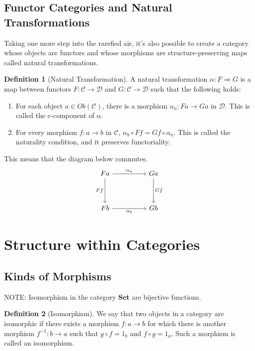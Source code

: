 \documentclass{article}
\theoremstyle{definition}
\newtheorem{definition}{Definition}
\begin{document}
\subsection*{Functor Categories and Natural Transformations}
Taking one more step into the rarefied air, it's also possible to create a category whose objects are functors and whose morphisms are structure-preserving maps called natural transformations.
\begin{definition}[Natural Transformation]
    A natural transformation $\alpha :F\Rightarrow G$ is a map between functors $F:\mathcal{C}\rightarrow\mathcal{D}$ and $G:\mathcal{C}\rightarrow\mathcal{D}$ such that the following holds:
    \begin{enumerate}
        \item For each object $a \in Ob(\mathcal{C})$, there is a morphism $\alpha_a:Fa\rightarrow Ga$ in $\mathcal{D}$. This is called the c-component of $\alpha$.
        \item For every morphism $f:a\rightarrow b$ in $\mathcal{C}$, $\alpha_b\circ Ff=Gf\circ\alpha_a$. This is called the naturality condition, and it preserves functoriality.
    \end{enumerate}

    This means that the diagram below commutes.
    \[\begin{tikzcd}
            Fa && Ga \\
            \\
            Fb && Gb
            \arrow["{\alpha_b}"', from=3-1, to=3-3]
            \arrow["Gf", from=1-3, to=3-3]
            \arrow["Ff"', from=1-1, to=3-1]
            \arrow["{\alpha_a}", from=1-1, to=1-3]
        \end{tikzcd}\]

\end{definition}

\section*{Structure within Categories}
\subsection*{Kinds of Morphisms}

NOTE: Isomorphism in the category \textbf{Set} are bijective functions.
\begin{definition}[Isomorphism]
    We say that two objects in a category are isomorphic if there exists a morphism $f:a\rightarrow b$ for which there is another morphism $f^{-1}:b\rightarrow a$ such that $g\circ f=1_b$ and $f\circ g=1_a$.
    Such a morphism is called an isomorphism.
\end{definition}
\end{document}
